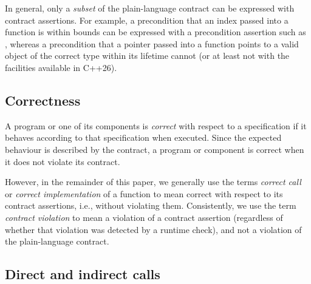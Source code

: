 In general, only a \emph{subset} of the plain-language contract can be expressed with contract assertions. For example, a precondition that an index passed into a function is within bounds can be expressed with a precondition assertion such as \mbox{}, whereas a precondition that a pointer passed into a function points to a valid object of the correct type within its lifetime cannot (or at least not with the facilities available in C++26).

\subsection{Correctness}
\label{correctness}

A program or one of its components is \emph{correct} with respect to a specification if it behaves according to that specification when executed. Since the expected behaviour is described by the contract, a program or component is correct when it does not violate its contract.

However, in the remainder of this paper, we generally use the terms \emph{correct call} or \emph{correct implementation} of a function to mean {correct with respect to its contract assertions}, i.e., without violating them. 
Consistently, we use the term \emph{contract violation} to mean a violation of a contract assertion (regardless of whether that violation was detected by a runtime check), and not a violation of the plain-language contract.


 
\subsection{Direct and indirect calls}

